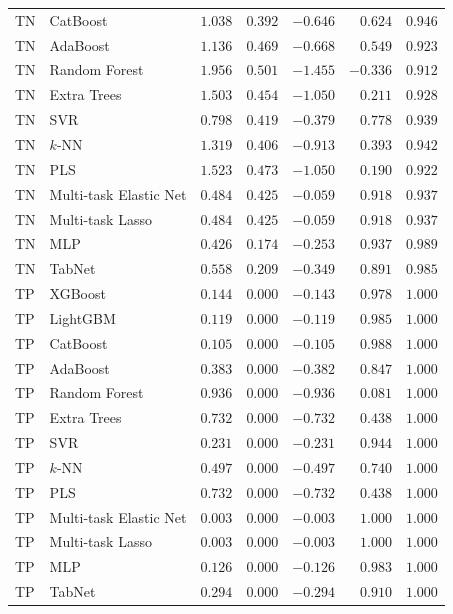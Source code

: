 \begin{longtable}{lp{3.1cm}rrrrr}
TN & CatBoost & $1.038$ & $0.392$ & $-0.646$ & $0.624$ & $0.946$ \\
TN & AdaBoost & $1.136$ & $0.469$ & $-0.668$ & $0.549$ & $0.923$ \\
TN & Random Forest & $1.956$ & $0.501$ & $-1.455$ & $-0.336$ & $0.912$ \\
TN & Extra Trees & $1.503$ & $0.454$ & $-1.050$ & $0.211$ & $0.928$ \\
TN & SVR & $0.798$ & $0.419$ & $-0.379$ & $0.778$ & $0.939$ \\
TN & $k$-NN & $1.319$ & $0.406$ & $-0.913$ & $0.393$ & $0.942$ \\
TN & PLS & $1.523$ & $0.473$ & $-1.050$ & $0.190$ & $0.922$ \\
TN & Multi-task Elastic Net & $0.484$ & $0.425$ & $-0.059$ & $0.918$ & $0.937$ \\
TN & Multi-task Lasso & $0.484$ & $0.425$ & $-0.059$ & $0.918$ & $0.937$ \\
TN & MLP & $0.426$ & $0.174$ & $-0.253$ & $0.937$ & $0.989$ \\
TN & TabNet & $0.558$ & $0.209$ & $-0.349$ & $0.891$ & $0.985$ \\
TP & XGBoost & $0.144$ & $0.000$ & $-0.143$ & $0.978$ & $1.000$ \\
TP & LightGBM & $0.119$ & $0.000$ & $-0.119$ & $0.985$ & $1.000$ \\
TP & CatBoost & $0.105$ & $0.000$ & $-0.105$ & $0.988$ & $1.000$ \\
TP & AdaBoost & $0.383$ & $0.000$ & $-0.382$ & $0.847$ & $1.000$ \\
TP & Random Forest & $0.936$ & $0.000$ & $-0.936$ & $0.081$ & $1.000$ \\
TP & Extra Trees & $0.732$ & $0.000$ & $-0.732$ & $0.438$ & $1.000$ \\
TP & SVR & $0.231$ & $0.000$ & $-0.231$ & $0.944$ & $1.000$ \\
TP & $k$-NN & $0.497$ & $0.000$ & $-0.497$ & $0.740$ & $1.000$ \\
TP & PLS & $0.732$ & $0.000$ & $-0.732$ & $0.438$ & $1.000$ \\
TP & Multi-task Elastic Net & $0.003$ & $0.000$ & $-0.003$ & $1.000$ & $1.000$ \\
TP & Multi-task Lasso & $0.003$ & $0.000$ & $-0.003$ & $1.000$ & $1.000$ \\
TP & MLP & $0.126$ & $0.000$ & $-0.126$ & $0.983$ & $1.000$ \\
TP & TabNet & $0.294$ & $0.000$ & $-0.294$ & $0.910$ & $1.000$ \\

\end{longtable}
